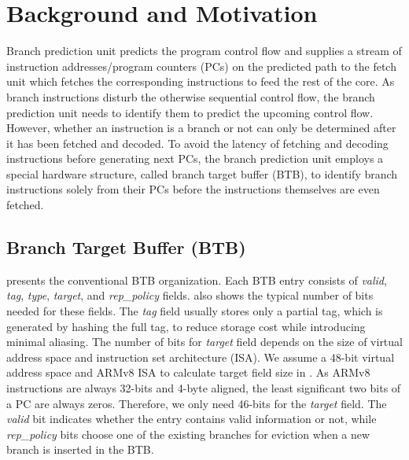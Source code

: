 \section{Background and Motivation}
\label{hpca:sec:background}

Branch prediction unit predicts the program control flow and supplies a stream of instruction addresses/program counters (PCs) on the predicted path to the fetch unit which fetches the corresponding instructions to feed the rest of the core. As branch instructions disturb the otherwise sequential control flow, the branch prediction unit needs to identify them to predict the upcoming control flow. However, whether an instruction is a branch or not can only be determined after it has been fetched and decoded. To avoid the latency of fetching and decoding instructions before generating next PCs, the branch prediction unit employs a special hardware structure, called branch target buffer (BTB), to identify branch instructions solely from their PCs before the instructions themselves are even fetched.

\subsection{Branch Target Buffer (BTB)}
 presents the conventional BTB organization. Each BTB entry consists of \textit{valid}, \textit{tag}, \textit{type}, \textit{target}, and \textit{rep\_policy} fields.  also shows the typical number of bits needed for these fields. The \textit{tag} field usually stores only a partial tag, which is generated by hashing the full tag, to reduce storage cost while introducing minimal aliasing. The number of bits for \textit{target} field depends on the size of virtual address space and instruction set architecture (ISA). We assume a 48-bit virtual address space and ARMv8 ISA to calculate target field size in . As ARMv8 instructions are always 32-bits and 4-byte aligned, the least significant two bits of a PC are always zeros. Therefore, we only need 46-bits for the \textit{target} field. The \textit{valid} bit indicates whether the entry contains valid information or not, while \textit{rep\_policy} bits choose one of the existing branches for eviction when a new branch is inserted in the BTB.

